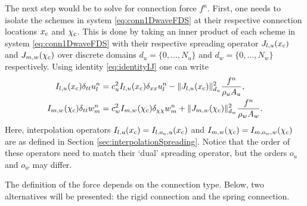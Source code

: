 The next step would be to solve for connection force $f^n$. First, one needs to isolate the schemes in system \eqref{eq:conn1DwaveFDS} at their respective connection locations $x_{\text{c}}$ and $\chi_{\text{c}}$. This is done by taking an inner product of each scheme in system \eqref{eq:conn1DwaveFDS} with their respective spreading operator $J_{l, u}(x_{\text{c}})$ and $J_{m, w}(\chi_{\text{c}})$ over discrete domains $d_u = \{0, \hdots, N_u\}$ and $d_w = \{0, \hdots, N_w\}$ respectively. Using identity \eqref{eq:identityIJ} one can write
\begin{subequations}\label{eq:conn1DwaveFDSXc}
    \begin{align}
        I_{l, u}(x_{\text{c}})\delta_{tt} u_l^n &= c_u^2 I_{l, u}(x_{\text{c}})\delta_{xx} u_l^n -\lVert J_{l, u}(x_{\text{c}})\rVert_{d_u}^2\frac{f^n}{\rho_u A_u}, \label{eq:conn1DwaveuXc} \\
        I_{m, w}(\chi_{\text{c}})\delta_{tt} w_m^n &= c_w^2 I_{m, w}(\chi_{\text{c}})\delta_{\chi\chi} w_m^n + \lVert J_{m, w}(\chi_{\text{c}})\rVert_{d_w}^2\frac{f^n}{\rho_w A_w}.\label{eq:conn1DwavewXc}
    \end{align}
\end{subequations}
Here, interpolation operators $I_{l, u}(x_{\text{c}}) = I_{l, o_u, u}(x_{\text{c}})$ and $I_{m, w}(\chi_{\text{c}}) = I_{m, o_w, w}(\chi_{\text{c}})$ are as defined in Section \ref{sec:interpolationSpreading}. Notice that the order of these operators need 
to match their `dual' spreading operator, but the orders $o_u$ and $o_w$ may differ.

The definition of the force depends on the connection type. Below, two alternatives will be presented: the rigid connection and the spring connection. 

